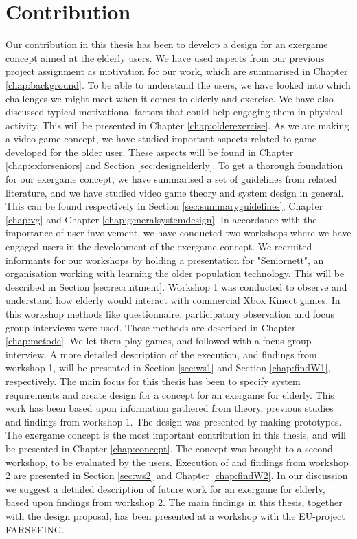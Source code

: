 \section{Contribution}
Our contribution in this thesis has been to develop a design for an exergame concept aimed at the elderly users. We have used aspects from our previous project assignment as motivation for our work, which are summarised in Chapter \ref{chap:background}. To be able to understand the users, we have looked into which challenges we might meet when it comes to elderly and exercise. We have also discussed typical motivational factors that could help engaging them in physical activity. This will be presented in Chapter \ref{chap:olderexercise}. As we are making a video game concept, we have studied important aspects related to game developed for the older user. These aspects will be found in Chapter \ref{chap:exforseniors} and Section \ref{sec:designelderly}. To get a thorough foundation for our exergame concept, we have summarised a set of guidelines from related literature, and we have studied video game theory and system design in general. This can be found respectively in Section \ref{sec:summaryguidelines}, Chapter \ref{chap:vg} and Chapter \ref{chap:generalsystemdesign}. In accordance with the importance of user involvement, we have conducted two workshops where we have engaged users in the development of the exergame concept. We recruited informants for our workshops by holding a presentation for "Seniornett", an organisation working with learning the older population technology. This will be described in Section \ref{sec:recruitment}. Workshop 1 was conducted to observe and understand how elderly would interact with commercial Xbox Kinect games. In this workshop methods like questionnaire, participatory observation and focus group interviews were used. These methods are described in Chapter \ref{chap:metode}. We let them play games, and followed with a focus group interview. A more detailed description of the execution, and findings from workshop 1, will be presented in Section \ref{sec:ws1} and Section \ref{chap:findW1}, respectively. The main focus for this thesis has been to specify system requirements and create design for a concept for an exergame for elderly. This work has been based upon information gathered from theory, previous studies and findings from workshop 1. The design was presented by making prototypes. The exergame concept is the most important contribution in this thesis, and will be presented in Chapter \ref{chap:concept}. The concept was brought to a second workshop, to be evaluated by the users. Execution of and findings from workshop 2 are presented in Section \ref{sec:ws2} and Chapter \ref{chap:findW2}. In our discussion we suggest a detailed description of future work for an exergame for elderly, based upon findings from workshop 2. The main findings in this thesis, together with the design proposal, has been presented at a workshop with the EU-project FARSEEING.  

